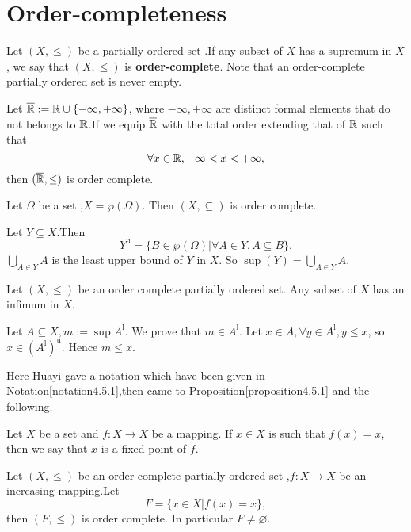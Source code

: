 \documentclass{book}
\numberwithin{equation}{section}
\begin{document}
\section{Order-completeness}
\begin{definitionenv}
    Let $(X,\le)$ be a partially ordered set .If any subset of $X$ has a supremum in $X$, we say that  $(X, \le)$ is \textbf{order-complete}. Note that an order-complete
partially ordered set is never empty.
\end{definitionenv}
\begin{axiomenv}
    Let $\overline{\mathbb{R}}:=\mathbb{R}\cup\{-\infty,+\infty\}$, where $-\infty,+\infty$ are distinct formal elements that do not belongs to $\mathbb{R}$.If we equip $\overline{\mathbb{R}}$ with the total order extending that of $\mathbb{R}$ such that 
    $$\forall x\in \mathbb{R},-\infty<x<+\infty,$$ 
    then $(\overline{\mathbb{R}},\le)$ is order complete.
\end{axiomenv}
\begin{exampleenv}
    Let $\Omega$ be a set ,$X=\wp(\Omega)$. Then $(X,\subseteq)$ is  order complete.
    \begin{proofenv}
        Let $Y\subseteq X$.Then 
        $$Y^{\mathrm{u}}=\{B\in\wp(\Omega)|\forall A\in Y,A\subseteq B\}.$$
        $\displaystyle \bigcup_{A\in Y}A$ is the least upper bound of $Y$ in $X$. So $\sup (Y)=\bigcup_{A\in Y}A$.
    \end{proofenv}
\end{exampleenv}
\begin{propositionenv}
    Let $(X,\le)$ be an order complete partially ordered set. Any subset of $X$ has an infimum in $X$.
\end{propositionenv}
\begin{proofenv}
    Let $A\subseteq X,m:=\sup A^\mathrm{l}$. We prove that $m\in A^\mathrm{l}$.
    \newline
    Let $x\in A,\forall y \in A^\mathrm{l},y\le x $, so $x\in (A^\mathrm{l})^\mathrm{u}$. Hence $m\le x$.
\end{proofenv}
Here Huayi gave a notation which have been given in Notation\ref{notation4.5.1},then came to Proposition\ref{proposition4.5.1} and the following.
\begin{definitionenv}
    Let $X$ be a set and $f:X\rightarrow X$ be a mapping. If $x\in X $ is such that $f(x)=x$, then we say that $x$ is a fixed point of $f$. 
\end{definitionenv}
\begin{theoremenv}
    \quad
    \newline
    Let $(X,\le)$ be an order complete partially ordered set ,$f:X\rightarrow X$ be an increasing mapping.Let 
    $$F=\{x\in X|f(x)=x\},$$
    then $(F,\le)$ is order complete. In particular $F\not=\varnothing$.
    
\end{theoremenv}
\end{document}
